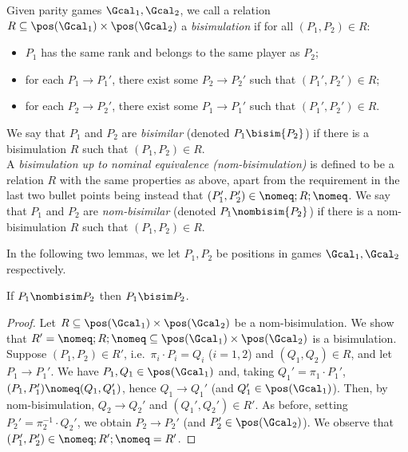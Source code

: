\begin{definition}
Given parity games $\Gcal_1, \Gcal_2$, we call a relation $R \subseteq \pos(\Gcal_1) \times \pos(\Gcal_2)$ a \emph{bisimulation} if for all $(P_1, P_2) \in R$:
    \begin{itemize}
        \item $P_1$ has the same rank and belongs to the same player as $P_2$;
        \item for each $P_1 \rightarrow P_1'$, there exist some $P_2 \rightarrow P_2'$  such that $(P_1',P_2')\in R$;
        \item for each $P_2 \rightarrow P_2'$, there exist some $P_1 \rightarrow P_1'$ such that $(P_1', P_2') \in R$.
    \end{itemize}
    We say that $P_1$ and $P_2$ are \emph{bisimilar} (denoted ${P_1}\bisim{P_2}$)
    if there is a bisimulation $R$ such that $(P_1, P_2) \in R$. \\
    A \emph{bisimulation up to nominal equivalence (nom-bisimulation)} is defined to be a relation $R$ with the same properties as above, apart from the requirement in the last two bullet points being instead that $(P_1',P_2')\in {\nomeq};R;{\nomeq}$.
    We say that $P_1$ and $P_2$ are \emph{nom-bisimilar} (denoted ${P_1}\nombisim{P_2}$)
    if there is a nom-bisimulation $R$ such that $(P_1, P_2) \in R$. 
\end{definition}

In the following two lemmas, we let $P_1,P_2$ be positions in games $\Gcal_1,\Gcal_2$ respectively.

\begin{lemma}\label{lem:nombisimbisim}
If $P_1\nombisim P_2$ then $P_1\bisim P_2$. %
\end{lemma}
\begin{proof}
  Let $R\subseteq\pos(\Gcal_1)\times\pos(\Gcal_2)$ be 
  a nom-bisimulation. We show that $R'={\nomeq;R;\nomeq}\subseteq\pos(\Gcal_1)\times\pos(\Gcal_2)$ is a bisimulation.
Suppose $(P_1,P_2)\in R'$, i.e.\ $\pi_i\cdot P_i=Q_i$ ($i=1,2$) and $(Q_1,Q_2)\in R$, and let $P_1\to P_1'$. We have $P_1,Q_1\in\pos(\Gcal_1)$ and, taking $Q_1'=\pi_1\cdot P_1'$, $(P_1,P_1')\nomeq(Q_1,Q_1')$, hence $Q_1\to Q_1'$ (and $Q_1'\in\pos(\Gcal_1)$). Then, by nom-bisimulation, $Q_2\to Q_2'$ and $(Q_1',Q_2')\in R'$. As before, setting $P_2'=\pi_2^{-1}\cdot Q_2'$, we obtain $P_2\to P_2'$ (and $P_2'\in\pos(\Gcal_2)$). We observe that $(P_1',P_2')\in{\nomeq;R';\nomeq}=R'$.
\end{proof}

